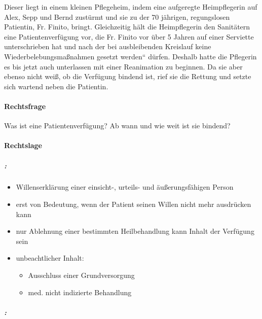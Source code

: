 Dieser liegt in einem kleinen Pflegeheim, indem eine aufgeregte
Heimpflegerin auf Alex, Sepp und Bernd zust\"urmt und sie zu der 70
jährigen, regungslosen Patientin, Fr. Finito, bringt.
Gleichzeitig hält die Heimpflegerin den Sanitätern eine Patientenverf\"ugung vor, die
Fr. Finito vor \"uber 5 Jahren auf einer Serviette unterschrieben hat
und nach der {\quotedblbase}bei ausbleibenden Kreislauf keine
Wiederbelebungsma{\ss}nahmen gesetzt werden{\textquotedblleft}
d\"urfen. Deshalb hatte die Pflegerin es bis jetzt auch unterlassen mit
einer Reanimation zu beginnen. Da sie aber ebenso nicht wei{\ss}, ob
die Verf\"ugung bindend ist, rief sie die Rettung und setzte sich
wartend neben die Patientin.

\paragraph*{Rechtsfrage}

Was ist eine Patientenverf\"ugung? Ab wann und wie weit ist sie bindend?

\paragraph*{Rechtslage}

\subparagraph*{:}

\begin{itemize}
	\item 
	Willenserklärung einer einsicht-, urteils- und
	äu{\ss}erungsfähigen Person

	\item {\mdseries
	erst von Bedeutung, wenn der Patient seinen Willen nicht mehr ausdr\"ucken
	kann}

	\item {\mdseries
	nur Ablehnung einer bestimmten Heilbehandlung kann Inhalt der Verf\"ugung sein}

	\item unbeachtlicher Inhalt:

	\begin{itemize}
		\item Ausschluss einer Grundversorgung

		\item med. nicht indizierte Behandlung
	\end{itemize}
\end{itemize}

\subparagraph*{:}


